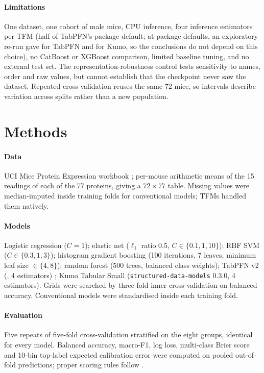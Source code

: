 \documentclass[10pt]{article}
\begin{document}
\paragraph{Limitations} One dataset, one cohort of male mice, CPU inference, four inference
estimators per TFM (half of TabPFN's package default; at package defaults, an exploratory re-run
gave \EstTabpfnBA{} for TabPFN and \EstKumoBA{} for Kumo, so the conclusions do not depend on this
choice), no CatBoost or XGBoost comparison, limited baseline tuning, and no external test set.
The representation-robustness control tests sensitivity to names, order and raw values, but cannot establish
that the checkpoint never saw the dataset. Repeated cross-validation reuses the same
72 mice, so intervals describe variation across splits rather than a new population.

\section{Methods}

\paragraph{Data} UCI Mice Protein Expression workbook \cite{uci2015}; per-mouse arithmetic means
of the 15 readings of each of the 77 proteins, giving a $72 \times 77$ table. Missing values
were median-imputed inside training folds for conventional models; TFMs handled them natively.

\paragraph{Models} Logistic regression ($C = 1$); elastic net ($\ell_1$ ratio 0.5,
$C \in \{0.1, 1, 10\}$); RBF SVM ($C \in \{0.3, 1, 3\}$); histogram gradient boosting (100
iterations, 7 leaves, minimum leaf size $\in \{4, 8\}$); random forest (500 trees, balanced class
weights); TabPFN v2 (\TabpfnVersion, 4 estimators) \cite{hollmann2025}; Kumo Tabular Small
(\texttt{structured-data-models} 0.3.0, 4 estimators). Grids were searched by three-fold inner
cross-validation on balanced accuracy. Conventional models were standardised inside each
training fold.

\paragraph{Evaluation} Five repeats of five-fold cross-validation stratified on the eight groups,
identical for every model. Balanced accuracy, macro-F1, log loss, multi-class Brier score
\cite{brier1950} and 10-bin top-label expected calibration error \cite{guo2017} were computed on
pooled out-of-fold predictions; proper scoring rules follow \cite{gneiting2007}.
\end{document}
